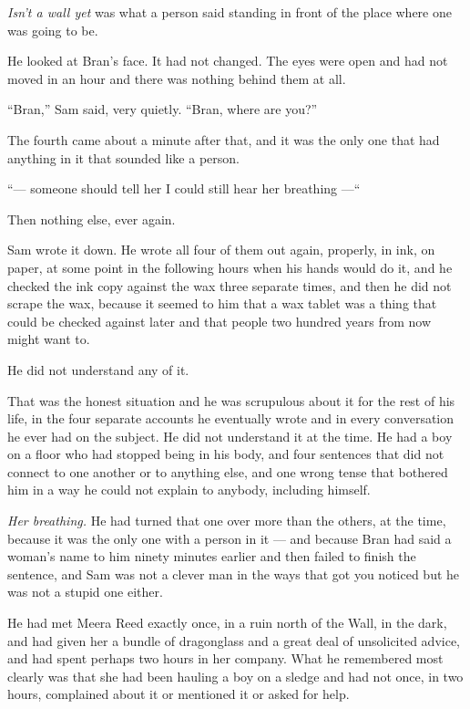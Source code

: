 \textit{Isn’t a wall yet} was what a person said standing in front of the place where one was going to be.

He looked at Bran’s face. It had not changed. The eyes were open and had not moved in an hour and there was nothing behind them at all.

“Bran,” Sam said, very quietly. “Bran, where are you?”

The fourth came about a minute after that, and it was the only one that had anything in it that sounded like a person.

“— someone should tell her I could still hear her breathing —“

Then nothing else, ever again.

\sceneBreak

Sam wrote it down. He wrote all four of them out again, properly, in ink, on paper, at some point in the following hours when his hands would do it, and he checked the ink copy against the wax three separate times, and then he did not scrape the wax, because it seemed to him that a wax tablet was a thing that could be checked against later and that people two hundred years from now might want to.

He did not understand any of it.

That was the honest situation and he was scrupulous about it for the rest of his life, in the four separate accounts he eventually wrote and in every conversation he ever had on the subject. He did not understand it at the time. He had a boy on a floor who had stopped being in his body, and four sentences that did not connect to one another or to anything else, and one wrong tense that bothered him in a way he could not explain to anybody, including himself.

\textit{Her breathing.} He had turned that one over more than the others, at the time, because it was the only one with a person in it — and because Bran had said a woman’s name to him ninety minutes earlier and then failed to finish the sentence, and Sam was not a clever man in the ways that got you noticed but he was not a stupid one either.

He had met Meera Reed exactly once, in a ruin north of the Wall, in the dark, and had given her a bundle of dragonglass and a great deal of unsolicited advice, and had spent perhaps two hours in her company. What he remembered most clearly was that she had been hauling a boy on a sledge and had not once, in two hours, complained about it or mentioned it or asked for help.

